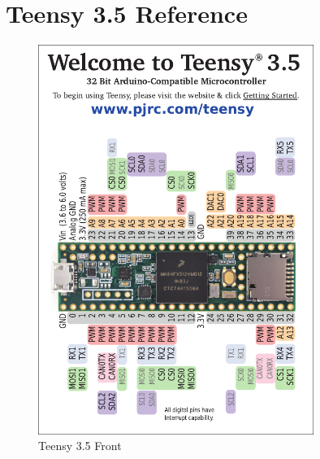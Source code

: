 \documentclass{article}
\begin{document}
\section{Teensy 3.5 Reference}
%
\begin{figure}[H]
    \centering
    \includegraphics[width=0.8\textwidth]{images/card8a_rev2.pdf}
    \caption{Teensy 3.5 Front}
    \label{fig:teensy-front}
\end{figure}
\end{document}
